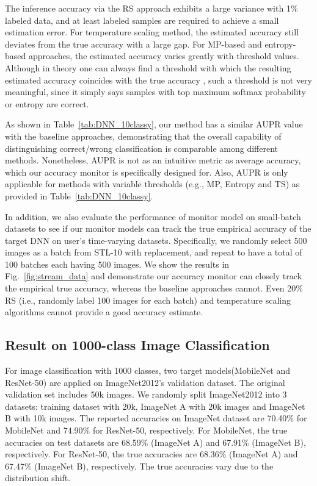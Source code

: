 \documentclass{article}
\newcommand{\cloudModels}{target models\xspace}
\newcommand{\monitorModel}{monitor model\xspace}
\begin{document}
The inference accuracy via the RS approach exhibits a large variance with 1\% labeled data, and at least  labeled samples are required to achieve a small estimation error. For temperature scaling method, the estimated accuracy still deviates from the true accuracy with a large gap. For MP-based and entropy-based approaches, the estimated accuracy varies greatly with threshold values.
Although in theory one can always find a threshold with which
the resulting estimated accuracy coincides with the true accuracy ,
such a threshold is not very meaningful, since it simply says
samples with top   maximum softmax probability or entropy
are correct.


As shown in Table~\ref{tab:DNN_10classy}, our method has a similar AUPR value with the baseline
approaches, demonstrating that the
overall capability of distinguishing correct/wrong classification is
comparable among different methods. Nonetheless, AUPR is not
as
an intuitive metric as average accuracy, which our accuracy monitor is specifically designed for. Also, AUPR is only applicable for methods with variable thresholds (e.g., MP, Entropy and TS) as provided in Table~\ref{tab:DNN_10classy}.

In addition, we also evaluate the performance of \monitorModel on
small-batch datasets to see if our monitor models
can track the true empirical accuracy of the target DNN
on user's time-varying datasets. Specifically, we randomly select
500 images as a batch from STL-10 with replacement, and
repeat to have a total of 100 batches each having 500 images.
We show the results in Fig.~\ref{fig:stream_data}
and demonstrate our accuracy monitor can closely track
the empirical true accuracy, whereas the baseline approaches
cannot. Even 20\% RS (i.e., randomly label 100 images
for each batch) {and temperature scaling algorithms} cannot provide a good accuracy estimate.

\subsection{Result on 1000-class Image Classification}
For image classification with 1000 classes, two \cloudModels (MobileNet and ResNet-50) are applied on ImageNet2012's validation dataset. The original validation set includes 50k images. We randomly split ImageNet2012 into 3 datasets: training dataset with 20k, ImageNet A with 20k images and ImageNet B with 10k images. The reported accuracies on ImageNet dataset are 70.40\% for MobileNet and 74.90\% for ResNet-50, respectively. For MobileNet, the true accuracies on test datasets are 68.59\% (ImageNet A) and 67.91\% (ImageNet B), respectively. For ResNet-50, the true accuracies are 68.36\% (ImageNet A) and 67.47\% (ImageNet B), respectively. The true accuracies vary due to the  distribution shift.
\end{document}
